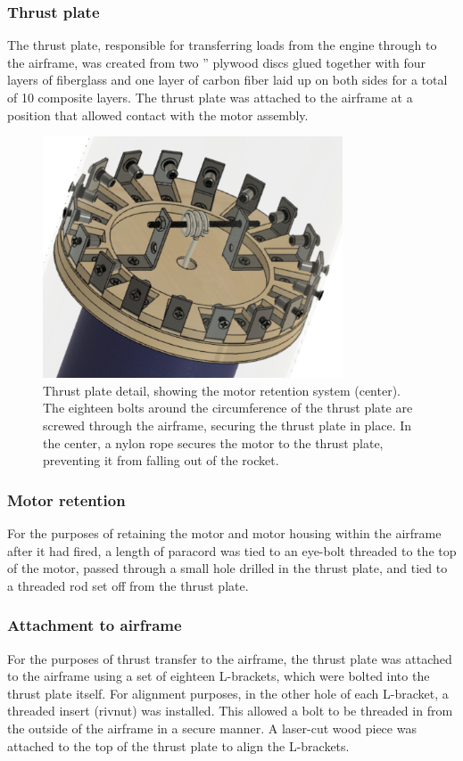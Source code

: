 \subsubsection*{Thrust plate}
The thrust plate, responsible for transferring loads from the engine through to the airframe, was created from two ” plywood discs glued together with four layers of fiberglass and one layer of carbon fiber laid up on both sides for a total of 10 composite layers. The thrust plate was attached to the airframe at a position that allowed contact with the motor assembly.
\begin{figure}[H]
	\centering
	\includegraphics[width=3.5in]{imgs/thrustplatedetail.png}
	\caption{Thrust plate detail, showing the motor retention system (center). The eighteen bolts around the circumference of the thrust plate are screwed through the airframe, securing the thrust plate in place. In the center, a nylon rope secures the motor to the thrust plate, preventing it from falling out of the rocket.}
	\label{fig:thrustplate}
\end{figure}
\subsubsection*{Motor retention}
For the purposes of retaining the motor and motor housing within the airframe after it had fired, a length of paracord was tied to an eye-bolt threaded to the top of the motor, passed through a small hole drilled in the thrust plate, and tied to a threaded rod set off from the thrust plate.
\subsubsection*{Attachment to airframe}
For the purposes of thrust transfer to the airframe, the thrust plate was attached to the airframe using a set of eighteen L-brackets, which were bolted into the thrust plate itself.  For alignment purposes, in the other hole of each L-bracket, a threaded insert (rivnut) was installed. This allowed a bolt to be threaded in from the outside of the airframe in a secure manner.  A laser-cut wood piece was attached to the top of the thrust plate to align the L-brackets.
